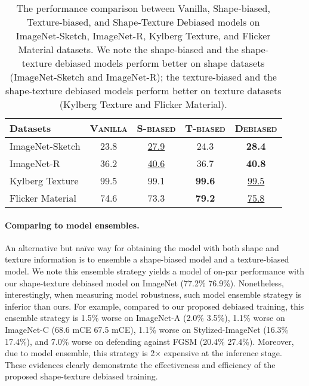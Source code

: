 \documentclass{article} \usepackage{iclr2021_conference,times}
\def\vs{{\bm{s}}}
\begin{document}
\begin{table}[]
\renewcommand\arraystretch{0.8}
\small
\centering
\begin{tabular}{l|cccc}
\toprule
Datasets & \scshape{Vanilla} & \scshape{S-biased} & \scshape{T-biased} & \scshape{Debiased} \\
\midrule
ImageNet-Sketch & 23.8 & \ul{27.9} & 24.3 & \textbf{28.4} \\
ImageNet-R & 36.2 & \ul{40.6} & 36.7 & \textbf{40.8} \\
\midrule
Kylberg Texture & 99.5 & 99.1 & \textbf{99.6} & \ul{99.5} \\
Flicker Material & 74.6 & 73.3 & \textbf{79.2} & \ul{75.8} \\
\bottomrule
\end{tabular}
\vspace{-0.9em}
\caption{The performance comparison between Vanilla, Shape-biased, Texture-biased, and Shape-Texture Debiased models on ImageNet-Sketch, ImageNet-R, Kylberg Texture, and Flicker Material datasets. We note the shape-biased and the shape-texture debiased models perform better on shape datasets (ImageNet-Sketch and ImageNet-R); the texture-biased and the shape-texture debiased models perform better on texture datasets (Kylberg Texture and Flicker Material).}
\label{tab:shape_or_texture_dataset}
\vspace{-1.3em}
\end{table}

\paragraph{Comparing to model ensembles.}
An alternative but na\"ive way for obtaining the model with both shape and texture information is to ensemble a shape-biased model and a texture-biased model. We note this ensemble strategy yields a model of on-par performance with our shape-texture debiased model on ImageNet (77.2\% \vs 76.9\%). Nonetheless, interestingly, 
when measuring model robustness, such model ensemble strategy is inferior than ours. For example, compared to our proposed debiased training, this ensemble strategy is 1.5\% worse on ImageNet-A (2.0\% \vs 3.5\%), 1.1\% worse on ImageNet-C (68.6 mCE \vs 67.5 mCE), 1.1\% worse on Stylized-ImageNet (16.3\% \vs 17.4\%), and 7.0\% worse on defending against FGSM (20.4\% \vs 27.4\%). Moreover, due to model  ensemble, this strategy is 2$\times$ expensive at the inference stage. These evidences clearly demonstrate the effectiveness and efficiency of the proposed shape-texture debiased training.
\end{document}
